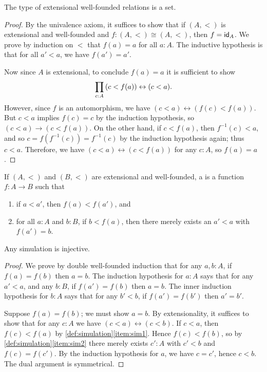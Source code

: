 \begin{thm}
  The type of extensional well-founded relations is a set.
\end{thm}
\begin{proof}
  By the univalence axiom, it suffices to show that if $(A,<)$ is extensional and well-founded and $f:(A,<) \cong (A,<)$, then $f=\idfunc[A]$.
  We prove by induction on $<$ that $f(a)=a$ for all $a:A$.
  The inductive hypothesis is that for all $a'<a$, we have $f(a')=a'$.

  Now since $A$ is extensional, to conclude $f(a)=a$ it is sufficient to show
  \[\prd{c:A}(c<f(a)) \leftrightarrow (c<a).\]
  However, since $f$ is an automorphism, we have $(c<a) \leftrightarrow (f(c)<f(a))$.
  But $c<a$ implies $f(c)=c$ by the induction hypothesis, so $(c<a) \to (c<f(a))$.
  On the other hand, if $c<f(a)$, then $f^{-1}(c)<a$, and so $c = f(f^{-1}(c)) = f^{-1}(c)$ by the induction hypothesis again; thus $c<a$.
  Therefore, we have $(c<a) \leftrightarrow (c<f(a))$ for any $c:A$, so $f(a)=a$.
\end{proof}

\begin{defn}\label{def:simulation}
  If $(A,<)$ and $(B,<)$ are extensional and well-founded, a  is a function $f:A\to B$ such that
  \begin{enumerate}
  \item if $a<a'$, then $f(a)<f(a')$, and\label{item:sim1}
  \item for all $a:A$ and $b:B$, if $b<f(a)$, then there merely exists an $a'<a$ with $f(a')=b$.\label{item:sim2}
  \end{enumerate}
\end{defn}

\begin{lem}
  Any simulation is injective.
\end{lem}
\begin{proof}
  We prove by double well-founded induction that for any $a,b:A$, if $f(a)=f(b)$ then $a=b$.
  The induction hypothesis for $a:A$ says that for any $a'<a$, and any $b:B$, if $f(a')=f(b)$ then $a=b$.
  The inner induction hypothesis for $b:A$ says that for any $b'<b$, if $f(a')=f(b')$ then $a'=b'$.

  Suppose $f(a)=f(b)$; we must show $a=b$.
  By extensionality, it suffices to show that for any $c:A$ we have $(c<a)\leftrightarrow (c<b)$.
  If $c<a$, then $f(c)<f(a)$ by \autoref{def:simulation}\ref{item:sim1}.
  Hence $f(c)<f(b)$, so by \autoref{def:simulation}\ref{item:sim2} there merely exists $c':A$ with $c'<b$ and $f(c)=f(c')$.
  By the induction hypothesis for $a$, we have $c=c'$, hence $c<b$.
  The dual argument is symmetrical.
\end{proof}

